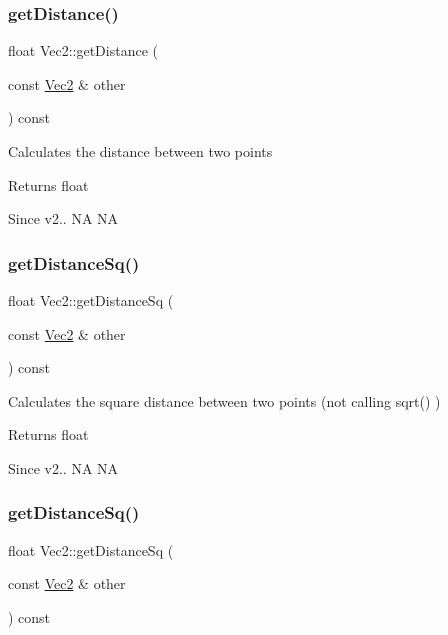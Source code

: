 \subsubsection{\texorpdfstring{get\+Distance()}{getDistance()}\hspace{0.1cm}{\footnotesize\ttfamily [2/2]}}
{\footnotesize\ttfamily float Vec2\+::get\+Distance (\begin{DoxyParamCaption}\item[{const \hyperlink{classVec2}{Vec2} \&}]{other }\end{DoxyParamCaption}) const\hspace{0.3cm}{\ttfamily [inline]}}

Calculates the distance between two points \begin{DoxyReturn}{Returns}
float 
\end{DoxyReturn}
\begin{DoxySince}{Since}
v2..  NA  NA 
\end{DoxySince}
\mbox{\label{classVec2_a5f2fee415aa806bdaad99e984cc991eb}} 
\subsubsection{\texorpdfstring{get\+Distance\+Sq()}{getDistanceSq()}\hspace{0.1cm}{\footnotesize\ttfamily [1/2]}}
{\footnotesize\ttfamily float Vec2\+::get\+Distance\+Sq (\begin{DoxyParamCaption}\item[{const \hyperlink{classVec2}{Vec2} \&}]{other }\end{DoxyParamCaption}) const\hspace{0.3cm}{\ttfamily [inline]}}

Calculates the square distance between two points (not calling sqrt() ) \begin{DoxyReturn}{Returns}
float 
\end{DoxyReturn}
\begin{DoxySince}{Since}
v2..  NA  NA 
\end{DoxySince}
\mbox{\label{classVec2_a5f2fee415aa806bdaad99e984cc991eb}} 
\subsubsection{\texorpdfstring{get\+Distance\+Sq()}{getDistanceSq()}\hspace{0.1cm}{\footnotesize\ttfamily [2/2]}}
{\footnotesize\ttfamily float Vec2\+::get\+Distance\+Sq (\begin{DoxyParamCaption}\item[{const \hyperlink{classVec2}{Vec2} \&}]{other }\end{DoxyParamCaption}) const\hspace{0.3cm}{\ttfamily [inline]}}

